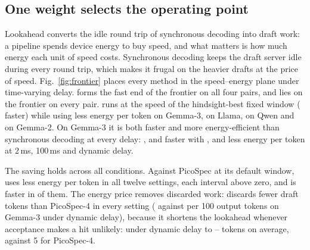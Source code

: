 \subsection{One weight selects the operating point}
\label{sec:frontier}
Lookahead converts the idle round trip of synchronous decoding into draft work: a pipeline spends device energy to buy speed, and what matters is how much energy each unit of speed costs. Synchronous decoding keeps the draft server idle during every round trip, which makes it frugal on the heavier drafts at the price of speed. Fig.~\ref{fig:frontier} places every method in the speed--energy plane under time-varying delay. \cape{} forms the fast end of the frontier on all four pairs, and \capee{} lies on the frontier on every pair. \capee{} runs at the speed of the hindsight-best fixed window ( faster) while using   less energy per token on Gemma-3,   on Llama,   on Qwen and  on Gemma-2. On Gemma-3 it is both faster and more energy-efficient than synchronous decoding at every delay: ,  and  faster with ,  and  less energy per token at 2\,ms, 100\,ms and dynamic delay.

The saving holds across all conditions. Against PicoSpec at its default window, \capee{} uses  less energy per token in all twelve settings, each interval above zero, and is faster in  of them. The energy price removes discarded work: \capee{} discards fewer draft tokens than PicoSpec-4 in every setting ( against  per 100 output tokens on Gemma-3 under dynamic delay), because it shortens the lookahead whenever acceptance makes a hit unlikely: under dynamic delay to -- tokens on average, against 5 for PicoSpec-4.

\begin{table}[t]
\centering
\caption{Energy weight $w$ on Gemma-3 under time-varying delay ( prompts, one session): throughput, device energy per token and change relative to $w=0$ with 95\% intervals.}
\label{tab:weights}
\footnotesize
\setlength{\tabcolsep}{2.6pt}

\end{table}

